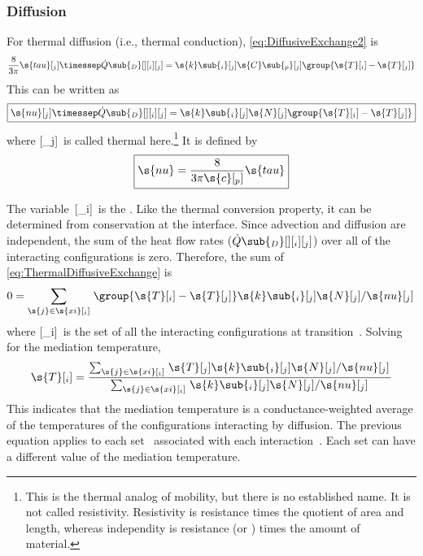 \subsubsection{Diffusion}

For thermal diffusion (i.e., thermal conduction), \autoref{eq:DiffusiveExchange2} is
\begin{equation}
  \label{eq:ThermalDiffusiveExchange1}
  \frac{8}{3\pi}\s{tau}[_j]\timessep\dot{Q}\sub{_D}[ ][_i][_j] = \s{k}\sub{_i}[_j]\s{C}\sub{_p}[_j]\group{\s{T}[_i] - \s{T}[_j]}
\end{equation}
This can be written as
\begin{equation}
  \label{eq:ThermalDiffusiveExchange}
  \boxed{\s{nu}[_j]\timessep\dot{Q}\sub{_D}[ ][_i][_j] = \s{k}\sub{_i}[_j]\s{N}[_j]\group{\s{T}[_i] - \s{T}[_j]}}
\end{equation}
where [_j]~is called thermal \emph{} here.\footnote{This is the thermal analog of mobility, but there is no established name.  It is not called resistivity.  Resistivity is resistance times the quotient of area and length, whereas independity is resistance (or \emph{}) times the amount of material.}  It is defined by
\begin{equation}
  \label{eq:ThermalIndependity}
  \boxed{\s{nu} = \frac{8}{3\pi\s{c}[_p]}\s{tau}}
\end{equation}

The variable~[_i]~is the \emph{}.  Like the thermal conversion property, it can be determined from conservation at the interface.  Since advection and diffusion are independent, the sum of the heat flow rates ($\dot{Q}\sub{_D}[ ][_i][_j]$) over all of the interacting configurations is zero.  Therefore, the sum of \autoref{eq:ThermalDiffusiveExchange} is
\begin{equation}
  0 = \sum_{\s{j} \in \s{xi}[_i]}\left.\group{\s{T}[_i] - \s{T}[_j]}\s{k}\sub{_i}[_j]\s{N}[_j]\middle/\s{nu}[_j]\right.
\end{equation}
where [_i]~is the set of all the interacting configurations at transition~.  Solving for the mediation temperature,
\begin{equation}
  \label{eq:MediationProperty}
  \s{T}[_i] = \frac{\sum_{\s{j} \in \s{xi}[_i]}\left.\s{T}[_j]\s{k}\sub{_i}[_j]\s{N}[_j]\middle/\s{nu}[_j]\right.}{\sum_{\s{j} \in \s{xi}[_i]}\left.\s{k}\sub{_i}[_j]\s{N}[_j]\middle/\s{nu}[_j]\right.}
\end{equation}
This indicates that the mediation temperature is a conductance-weighted average of the temperatures of the configurations interacting by diffusion.  The previous equation applies to each set~ associated with each interaction~.  Each set can have a different value of the mediation temperature.


